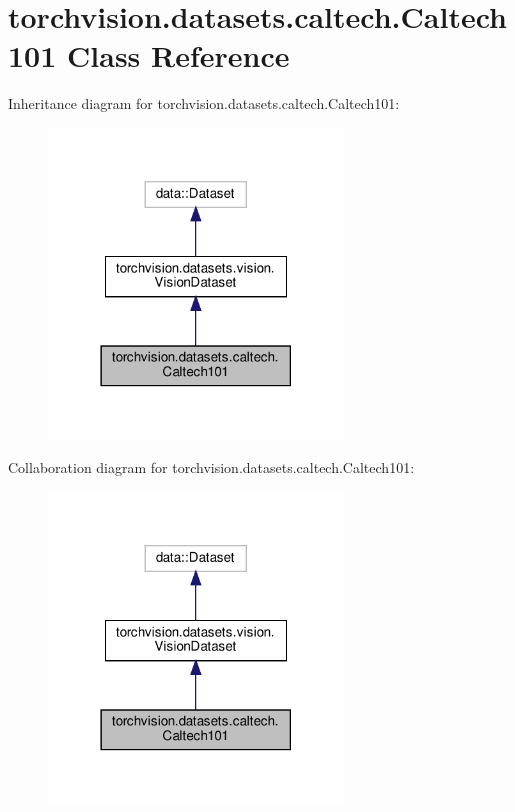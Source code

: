 \hypertarget{classtorchvision_1_1datasets_1_1caltech_1_1Caltech101}{}\section{torchvision.\+datasets.\+caltech.\+Caltech101 Class Reference}
\label{classtorchvision_1_1datasets_1_1caltech_1_1Caltech101}


Inheritance diagram for torchvision.\+datasets.\+caltech.\+Caltech101\+:
\nopagebreak
\begin{figure}[H]
\begin{center}
\leavevmode
\includegraphics[width=222pt]{classtorchvision_1_1datasets_1_1caltech_1_1Caltech101__inherit__graph}
\end{center}
\end{figure}


Collaboration diagram for torchvision.\+datasets.\+caltech.\+Caltech101\+:
\nopagebreak
\begin{figure}[H]
\begin{center}
\leavevmode
\includegraphics[width=222pt]{classtorchvision_1_1datasets_1_1caltech_1_1Caltech101__coll__graph}
\end{center}
\end{figure}
